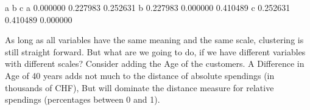 \documentclass[letterpaper,10pt,english]{jupyterBook}
\begin{document}
\noindent{}

\begin{sphinxVerbatim}[commandchars=\\\{\}]
          a         b         c
a  0.000000  0.227983  0.252631
b  0.227983  0.000000  0.410489
c  0.252631  0.410489  0.000000
\end{sphinxVerbatim}

\sphinxAtStartPar
As long as all variables have the same meaning and the same scale, clustering is still straight forward. But what are we going to do, if we have different variables with different scales? Consider adding the Age of the customers. A Difference in Age of 40 years adds not much to the distance of absolute spendings (in thousands of CHF), But will dominate the distance measure for relative spendings (percentages between 0 and 1).
\end{document}
